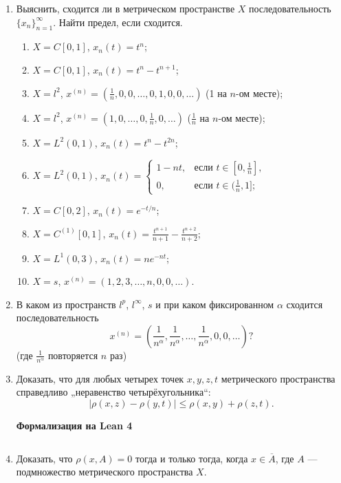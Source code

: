 \documentclass[12pt,a4paper]{article}
\begin{document}
\begin{enumerate}
\item Выяснить, сходится ли в метрическом пространстве $X$ последовательность $\{x_{n}\}_{n=1}^{\infty}$. Найти предел, если сходится.
\begin{enumerate}[label=\alph*)]
\item $X = C[0, 1]$, $x_{n}(t) = t^{n}$;
\item $X = C[0, 1]$, $x_{n}(t) = t^{n} - t^{n+1}$;
\item $X = l^{2}$, $x^{(n)} = (\frac{1}{n}, 0, 0, \dots, 0, 1, 0, 0, \dots)$ (1 на $n$-ом месте);
\item $X = l^{2}$, $x^{(n)} = (1, 0, \dots, 0, \frac{1}{n}, 0, \dots)$ ($\frac{1}{n}$ на $n$-ом месте);
\item $X = L^{2}(0, 1)$, $x_{n}(t) = t^{n} - t^{2n}$;
\item $X = L^{2}(0, 1)$, $x_{n}(t) =
\begin{cases} 1-nt, & \text{если } t\in[0, \frac{1}{n}], \\ 0, & \text{если } t\in(\frac{1}{n}, 1];
\end{cases}$
\item $X = C[0, 2]$, $x_{n}(t) = e^{-t/n}$;
\item $X = C^{(1)}[0, 1]$, $x_{n}(t) = \frac{t^{n+1}}{n+1} - \frac{t^{n+2}}{n+2}$;
\item $X = L^{1}(0, 3)$, $x_{n}(t) = n e^{-nt}$;
\item $X = s$, $x^{(n)} = (1, 2, 3, \dots, n, 0, 0, \dots)$.
\end{enumerate}

\item В каком из пространств $l^{p}$, $l^{\infty}$, $s$ и при каком фиксированном $\alpha$ сходится последовательность
$$x^{(n)} = \left(\frac{1}{n^{\alpha}}, \frac{1}{n^{\alpha}}, \dots, \frac{1}{n^{\alpha}}, 0, 0, \dots \right)?$$ (где $\frac{1}{n^{\alpha}}$ повторяется $n$ раз)

\newpage
\item Доказать, что для любых четырех точек $x, y, z, t$ метрического пространства справедливо „неравенство четырёхугольника“:
$$|\rho(x, z) - \rho(y, t)| \le \rho(x, y) + \rho(z, t).$$


\begin{center}\small\textbf{Формализация на Lean 4}\end{center}
\inputminted{lean}{FunAn/Section07_MetricSpaces/Task04.lean}

\newpage
\item Доказать, что $\rho(x, A) = 0$ тогда и только тогда, когда $x \in \overline{A}$, где $A$ — подмножество метрического пространства $X$.



\end{enumerate}
\end{document}
